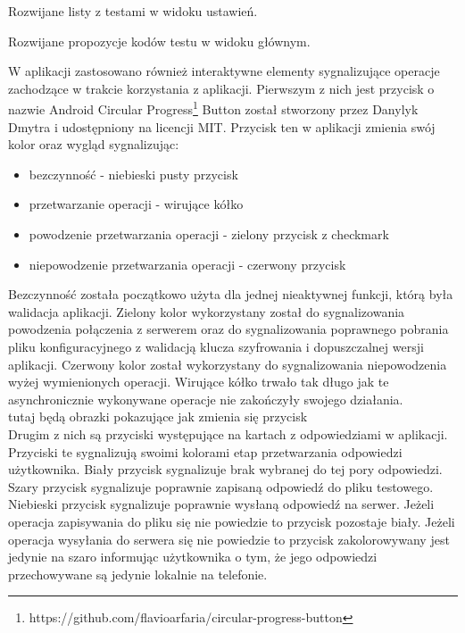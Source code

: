 \documentclass{report}
\begin{document}
		Rozwijane listy z testami w widoku ustawień.
		
		Rozwijane propozycje kodów testu w widoku głównym.
		
		W aplikacji zastosowano również interaktywne elementy sygnalizujące operacje zachodzące w trakcie korzystania z aplikacji.
		Pierwszym z nich jest przycisk o nazwie Android Circular Progress\footnote{https://github.com/flavioarfaria/circular-progress-button} Button został stworzony przez Danylyk Dmytra i udostępniony na licencji MIT. Przycisk ten w aplikacji zmienia swój kolor oraz wygląd sygnalizując:
		\begin{itemize}
			\item bezczynność - niebieski pusty przycisk
			\item przetwarzanie operacji - wirujące kółko
			\item powodzenie przetwarzania operacji - zielony przycisk z checkmark
			\item niepowodzenie przetwarzania operacji - czerwony przycisk 
		\end{itemize}
		Bezczynność została początkowo użyta dla jednej nieaktywnej funkcji, którą była walidacja aplikacji. Zielony kolor wykorzystany został do sygnalizowania powodzenia połączenia z serwerem oraz do sygnalizowania poprawnego pobrania pliku konfiguracyjnego z walidacją klucza szyfrowania i dopuszczalnej wersji aplikacji.
		Czerwony kolor został wykorzystany do sygnalizowania niepowodzenia wyżej wymienionych operacji.
		Wirujące kółko trwało tak długo jak te asynchronicznie wykonywane operacje nie zakończyły swojego działania.\\
		
		tutaj będą obrazki pokazujące jak zmienia się przycisk\\
		
		Drugim z nich są przyciski występujące na kartach z odpowiedziami w aplikacji. Przyciski te sygnalizują swoimi kolorami etap przetwarzania odpowiedzi użytkownika. Biały przycisk sygnalizuje brak wybranej do tej pory odpowiedzi. Szary przycisk sygnalizuje poprawnie zapisaną odpowiedź do pliku testowego. Niebieski przycisk sygnalizuje poprawnie wysłaną odpowiedź na serwer. Jeżeli operacja zapisywania do pliku się nie powiedzie to przycisk pozostaje biały. Jeżeli operacja wysyłania do serwera się nie powiedzie to przycisk zakolorowywany jest jedynie na szaro informując użytkownika o tym, że jego odpowiedzi przechowywane są jedynie lokalnie na telefonie.\\
		
\end{document}
